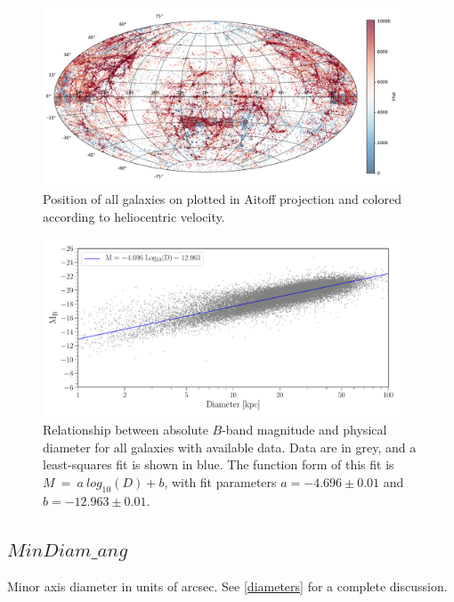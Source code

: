 \documentclass[iop]{emulateapj-rtx4}
\begin{document}
\begin{figure}[ht!]
        \centering
        \vspace{0pt}
        \includegraphics[width=0.95\textwidth]{allSkyVhel5.pdf}
        \caption{\small{Position of all galaxies on plotted in Aitoff projection and colored according to heliocentric velocity.}}
        \label{allskyvhel}
\end{figure}


\begin{figure}[ht!]
        \centering
        \vspace{0pt}
        \includegraphics[width=0.95\textwidth]{mag_v_diam_fit.pdf}
        \caption{\small{Relationship between absolute $B$-band magnitude and physical diameter for all galaxies with available data. Data are in grey, and a least-squares fit is shown in blue. The function form of this fit is $M ~=~ a ~ log_{10}(D) + b$, with fit parameters $a = -4.696 \pm 0.01$ and $b = -12.963 \pm 0.01$. }}
        \label{magvdiam}
\end{figure}


\subsection{$MinDiam\_ang$}
Minor axis diameter in units of arcsec. See \ref{diameters} for a complete discussion.
\end{document}
